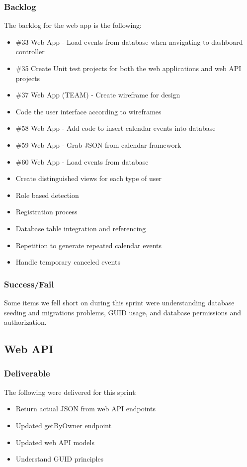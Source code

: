 \subsubsection{Backlog}
The backlog for the web app is the following:
\begin{itemize}
\item \#33 Web App - Load events from database when navigating to dashboard controller
\item \#35 Create Unit test projects for both the web applications and web API projects
\item \#37 Web App (TEAM) - Create wireframe for design
\item Code the user interface according to wireframes
\item \#58 Web App - Add code to insert calendar events into database
\item \#59 Web App - Grab JSON from calendar framework
\item \#60 Web App - Load events from database
\item Create distinguished views for each type of user
\item Role based detection
\item Registration process
\item Database table integration and referencing
\item Repetition to generate repeated calendar events
\item Handle temporary canceled events
\end{itemize}

\subsubsection{Success/Fail}
Some items we fell short on during this sprint were understanding database seeding and migrations problems, GUID usage, and database permissions and authorization.

\subsection{Web API}
\subsubsection{Deliverable}
The following were delivered for this sprint:
\begin{itemize}
\item Return actual JSON from web API endpoints
\item Updated getByOwner endpoint
\item Updated web API models
\item Understand GUID principles
\end{itemize}

